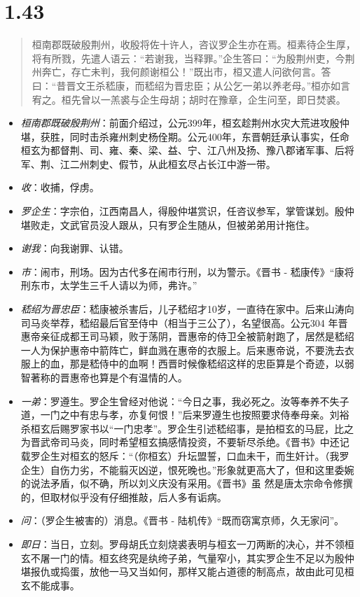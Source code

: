 \documentclass[]{book}
\providecommand{\tightlist}{%
  \setlength{\itemsep}{0pt}\setlength{\parskip}{0pt}}
\begin{document}
\section{1.43}\label{section-42}

\begin{quote}
桓南郡既破殷荆州，收殷将佐十许人，咨议罗企生亦在焉。桓素待企生厚，将有所戮，先遣人语云：``若谢我，当释罪。''企生答曰：``为殷荆州吏，今荆州奔亡，存亡未判，我何颜谢桓公！''既出市，桓又遣人问欲何言。答曰：``昔晋文王杀嵇康，而嵇绍为晋忠臣；从公乞一弟以养老母。''桓亦如言宥之。桓先曾以一羔裘与企生母胡；胡时在豫章，企生问至，即日焚裘。
\end{quote}

\begin{itemize}
\tightlist
\item
  \emph{桓南郡既破殷荆州}：前面介绍过，公元399年，桓玄趁荆州水灾大荒进攻殷仲堪，获胜，同时击杀雍州刺史杨佺期。公元400年，东晋朝廷承认事实，任命桓玄为都督荆、司、雍、秦、梁、益、宁、江八州及扬、豫八郡诸军事、后将军、荆、江二州刺史、假节，从此桓玄尽占长江中游一带。
\item
  \emph{收}：收捕，俘虏。
\item
  \emph{罗企生}：字宗伯，江西南昌人，得殷仲堪赏识，任咨议参军，掌管谋划。殷仲堪败走，文武官员没人跟从，只有罗企生随从，但被弟弟用计拖住。
\item
  \emph{谢我}：向我谢罪、认错。
\item
  \emph{市}：闹市，刑场。因为古代多在闹市行刑，以为警示。《晋书 -
  嵇康传》``康将刑东市，太学生三千人请以为师，弗许。''
\item
  \emph{嵇绍为晋忠臣}：嵇康被杀害后，儿子嵇绍才10岁，一直待在家中。后来山涛向司马炎举荐，嵇绍最后官至侍中（相当于三公了），名望很高。公元304
  年晋惠帝亲征成都王司马颖，败于荡阴，晋惠帝的侍卫全被箭射跑了，居然是嵇绍一人为保护惠帝中箭阵亡，鲜血溅在惠帝的衣服上。后来惠帝说，不要洗去衣服上的血，那是嵇侍中的血啊！西晋时候像嵇绍这样的忠臣算是个奇迹，以弱智著称的晋惠帝也算是个有温情的人。
\item
  \emph{一弟}：罗遵生。罗企生曾经对他说：``今日之事，我必死之。汝等奉养不失子道，一门之中有忠与孝，亦复何恨！''后来罗遵生也按照要求侍奉母亲。刘裕杀桓玄后赐罗家书以``一门忠孝''。罗企生引述嵇绍事，是拍桓玄的马屁，比之为晋武帝司马炎，同时希望桓玄搞感情投资，不要斩尽杀绝。《晋书》中还记载罗企生对桓玄的怒斥：``（你桓玄）升坛盟誓，口血未干，而生奸计。（我罗企生）自伤力劣，不能翦灭凶逆，恨死晚也。''形象就更高大了，但和这里委婉的说法矛盾，似不确，所以刘义庆没有采用。《晋书》虽
  然是唐太宗命令修撰的，但取材似乎没有仔细推敲，后人多有诟病。
\item
  \emph{问}：（罗企生被害的）消息。《晋书 -
  陆机传》``既而窃寓京师，久无家问''。
\item
  \emph{即日}：当日，立刻。罗母胡氏立刻烧裘表明与桓玄一刀两断的决心，并不领桓玄不屠一门的情。桓玄终究是纨绔子弟，气量窄小，其实罗企生不足以为殷仲堪报仇或捣蛋，放他一马又当如何，那样又能占道德的制高点，故由此可见桓玄不能成事。
\end{itemize}
\end{document}
